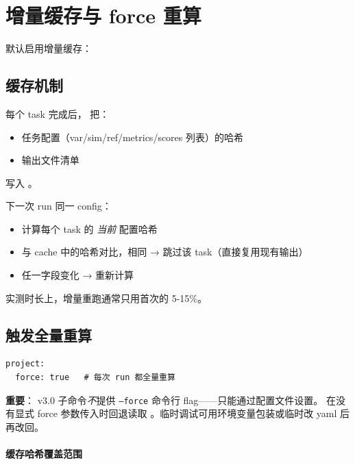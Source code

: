 
\section{增量缓存与 force 重算}

 默认启用增量缓存：

\subsection{缓存机制}

每个 task 完成后，\openbench{} 把：

\begin{itemize}
  \item 任务配置（var/sim/ref/metrics/scores 列表）的哈希
  \item 输出文件清单
\end{itemize}

写入 。

下一次 run 同一 config：

\begin{itemize}
  \item 计算每个 task 的 \emph{当前} 配置哈希
  \item 与 cache 中的哈希对比，相同 → 跳过该 task（直接复用现有输出）
  \item 任一字段变化 → 重新计算
\end{itemize}

实测时长上，增量重跑通常只用首次的 5-15\%。

\subsection{触发全量重算}

\begin{verbatim}
project:
  force: true   # 每次 run 都全量重算
\end{verbatim}

\textbf{重要}：\openbench{} v3.0  子命令\emph{不}提供 \texttt{--force} 命令行 flag——只能通过配置文件设置。 在没有显式 force 参数传入时回退读取 。临时调试可用环境变量包装或临时改 yaml 后再改回。

\paragraph{缓存哈希覆盖范围}

